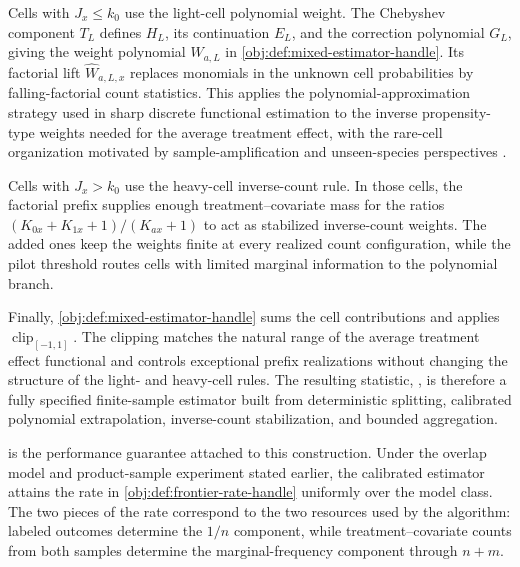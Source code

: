 \documentclass[11pt]{article}
\begin{document}
Cells with \(J_x\le k_0\) use the light-cell polynomial weight. The Chebyshev component \(T_L\) defines \(H_L\), its continuation \(E_L\), and the correction polynomial \(G_L\), giving the weight polynomial \(W_{a,L}\) in \cref{obj:def:mixed-estimator-handle}. Its factorial lift \(\widehat W_{a,L,x}\) replaces monomials in the unknown cell probabilities by falling-factorial count statistics. This applies the polynomial-approximation strategy used in sharp discrete functional estimation \citep{JiaoVenkatHanWeissman2015,WuYang2016} to the inverse propensity-type weights needed for the average treatment effect, with the rare-cell organization motivated by sample-amplification and unseen-species perspectives \citep{ValiantValiant2017,OrlitskySureshWu2016}.

Cells with \(J_x>k_0\) use the heavy-cell inverse-count rule. In those cells, the factorial prefix supplies enough treatment--covariate mass for the ratios \((K_{0x}+K_{1x}+1)/(K_{ax}+1)\) to act as stabilized inverse-count weights. The added ones keep the weights finite at every realized count configuration, while the pilot threshold routes cells with limited marginal information to the polynomial branch.

Finally, \cref{obj:def:mixed-estimator-handle} sums the cell contributions and applies \(\operatorname{clip}_{[-1,1]}\). The clipping matches the natural range of the average treatment effect functional and controls exceptional prefix realizations without changing the structure of the light- and heavy-cell rules. The resulting statistic, , is therefore a fully specified finite-sample estimator built from deterministic splitting, calibrated polynomial extrapolation, inverse-count stabilization, and bounded aggregation.

 is the performance guarantee attached to this construction. Under the overlap model and product-sample experiment stated earlier, the calibrated estimator attains the rate in \cref{obj:def:frontier-rate-handle} uniformly over the model class. The two pieces of the rate correspond to the two resources used by the algorithm: labeled outcomes determine the \(1/n\) component, while treatment--covariate counts from both samples determine the marginal-frequency component through \(n+m\).
\end{document}
